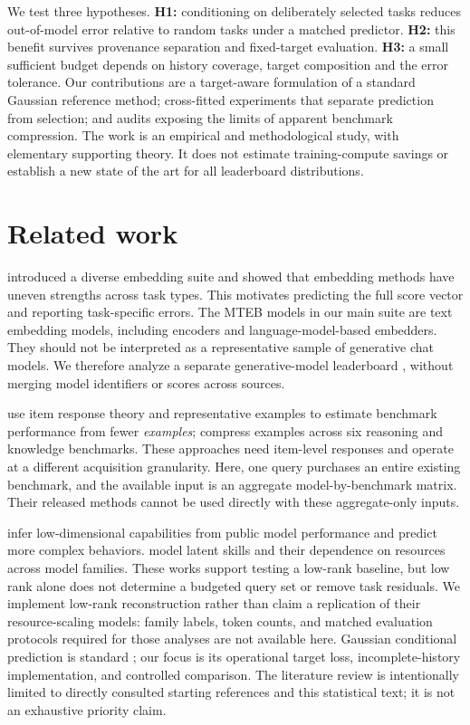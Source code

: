 \documentclass{article}
\begin{document}
We test three hypotheses. \textbf{H1:} conditioning on deliberately selected tasks reduces out-of-model error relative to random tasks under a matched predictor. \textbf{H2:} this benefit survives provenance separation and fixed-target evaluation. \textbf{H3:} a small sufficient budget depends on history coverage, target composition and the error tolerance. Our contributions are a target-aware formulation of a standard Gaussian reference method; cross-fitted experiments that separate prediction from selection; and audits exposing the limits of apparent benchmark compression. The work is an empirical and methodological study, with elementary supporting theory. It does not estimate training-compute savings or establish a new state of the art for all leaderboard distributions.

\section{Related work}
\label{sec:related}
\citet{mteb} introduced a diverse embedding suite and showed that embedding methods have uneven strengths across task types. This motivates predicting the full score vector and reporting task-specific errors. The MTEB models in our main suite are text embedding models, including encoders and language-model-based embedders. They should not be interpreted as a representative sample of generative chat models. We therefore analyze a separate generative-model leaderboard \citep{olldata}, without merging model identifiers or scores across sources.

\citet{tiny} use item response theory and representative examples to estimate benchmark performance from fewer \emph{examples}; \citet{metabench} compress examples across six reasoning and knowledge benchmarks. These approaches need item-level responses and operate at a different acquisition granularity. Here, one query purchases an entire existing benchmark, and the available input is an aggregate model-by-benchmark matrix. Their released methods cannot be used directly with these aggregate-only inputs.

\citet{observational} infer low-dimensional capabilities from public model performance and predict more complex behaviors. \citet{sloth} model latent skills and their dependence on resources across model families. These works support testing a low-rank baseline, but low rank alone does not determine a budgeted query set or remove task residuals. We implement low-rank reconstruction rather than claim a replication of their resource-scaling models: family labels, token counts, and matched evaluation protocols required for those analyses are not available here. Gaussian conditional prediction is standard \citep[Section 2.2]{gpml}; our focus is its operational target loss, incomplete-history implementation, and controlled comparison. The literature review is intentionally limited to directly consulted starting references and this statistical text; it is not an exhaustive priority claim.
\end{document}
